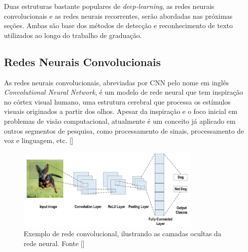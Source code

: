 Duas estruturas bastante populares de \textit{deep-learning}, as redes neurais convolucionais e as redes neurais recorrentes, serão abordadas nas próximas seções. Ambas são base dos métodos de detecção e reconhecimento de texto utilizados ao longo do trabalho de graduação.


\subsection{Redes Neurais Convolucionais}
As redes neurais convolucionais, abreviadas por CNN pelo nome em inglês \textit{Convolutional Neural Network}, é um modelo de rede neural que tem inspiração no córtex visual humano, uma estrutura cerebral que processa os estímulos visuais originados a partir dos olhos. Apesar da inspiração e o foco inicial em problemas de visão computacional, atualmente é um conceito já aplicado em outros segmentos de pesquisa, como processamento de sinais, processamento de voz e linguagem, etc. []

\begin{figure}
    \centering
    \includegraphics[width=0.8\textwidth]{figs/theory-cnn-example.png}
    \caption{Exemplo de rede convolucional, ilustrando as camadas ocultas da rede neural. Fonte []}
    \label{fig:theory-cnn-example}
\end{figure}

